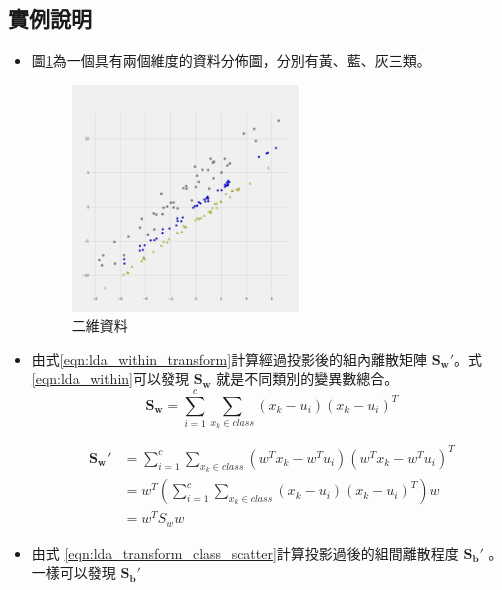 \subsection{實例說明}
\begin{itemize}
	\item
	      圖\ref{fig:lda_demostrate}為一個具有兩個維度的資料分佈圖，分別有黃、藍、灰三類。
	      \begin{figure}[h]
		      \centering
		      \includegraphics[width=6cm]{pic/lda_dataset.png}
		      \caption{二維資料}
		      \label{fig:lda_demostrate}
	      \end{figure}


	\item
	      由式\ref{eqn:lda_within_transform}計算經過投影後的組內離散矩陣 \(\mathbf{{S_w}'}\)。式 \ref{eqn:lda_within}可以發現 \(\mathbf{S_w}\) 就是不同類別的變異數總合。
	      \begin{equation}
		      \label{eqn:lda_within}
		      \mathbf{S_w}  =\sum_{i=1}^{c} \sum^{}_{x_k\in class}  (x_k - u_i)(x_k-u_i)^T
	      \end{equation}

	      \begin{equation}
		      \label{eqn:lda_within_transform}
		      \begin{aligned}
			      \mathbf{{S_w}'} & =\sum_{i=1}^{c} \sum^{}_{x_k\in class}  (w^Tx_k - w^Tu_i)(w^Tx_k-w^Tu_i)^T
			      \\& =w^T(\sum_{i=1}^{c} \sum^{}_{x_k\in class}  (x_k - u_i)(x_k-u_i)^T)w
			      \\& =w^TS_ww
		      \end{aligned}
	      \end{equation}


	\item
	      由式 \ref{eqn:lda_transform_class_scatter}計算投影過後的組間離散程度 \(\mathbf{{S_b}'}\) 。一樣可以發現 \(\mathbf{{S_b}'}\)


\end{itemize}
